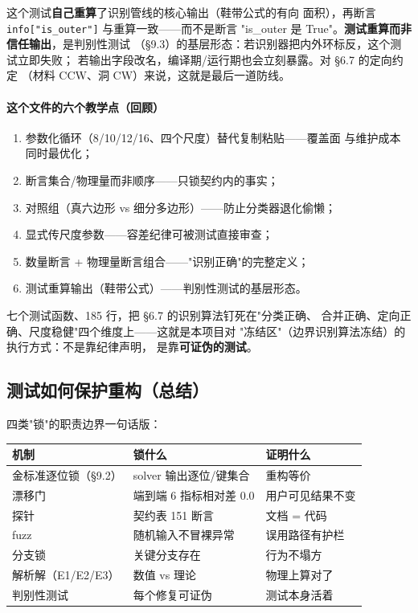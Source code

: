 \documentclass[12pt,a4paper]{ctexart}
\newcommand{\fem}{\Verb}
\begin{document}
这个测试\textbf{自己重算}了识别管线的核心输出（鞋带公式的有向
面积），再断言 \fem|info["is_outer"]| 与重算一致——而不是断言
"is\_outer 是 True"。\textbf{测试重算而非信任输出}，是判别性测试
（§9.3）的基层形态：若识别器把内外环标反，这个测试立即失败；
若输出字段改名，编译期/运行期也会立刻暴露。对 §6.7 的定向约定
（材料 CCW、洞 CW）来说，这就是最后一道防线。

\paragraph{这个文件的六个教学点（回顾）}

\begin{enumerate}[leftmargin=*]
  \item 参数化循环（8/10/12/16、四个尺度）替代复制粘贴——覆盖面
        与维护成本同时最优化；
  \item 断言集合/物理量而非顺序——只锁契约内的事实；
  \item 对照组（真六边形 vs 细分多边形）——防止分类器退化偷懒；
  \item 显式传尺度参数——容差纪律可被测试直接审查；
  \item 数量断言 + 物理量断言组合——"识别正确"的完整定义；
  \item 测试重算输出（鞋带公式）——判别性测试的基层形态。
\end{enumerate}

七个测试函数、185 行，把 §6.7 的识别算法钉死在"分类正确、
合并正确、定向正确、尺度稳健"四个维度上——这就是本项目对
"冻结区"（边界识别算法冻结）的执行方式：不是靠纪律声明，
是靠\textbf{可证伪的测试}。

\subsection{测试如何保护重构（总结）}

四类"锁"的职责边界一句话版：

\begin{table}[h]
\centering
\small
\begin{tabular}{p{4.6cm}p{4.4cm}p{5.6cm}}
\toprule
\textbf{机制} & \textbf{锁什么} & \textbf{证明什么} \\
\midrule
金标准逐位锁（§9.2） & solver 输出逐位/键集合 & 重构等价 \\
漂移门 & 端到端 6 指标相对差 0.0 & 用户可见结果不变 \\
探针 & 契约表 151 断言 & 文档 = 代码 \\
fuzz & 随机输入不冒裸异常 & 误用路径有护栏 \\
分支锁 & 关键分支存在 & 行为不塌方 \\
解析解（E1/E2/E3） & 数值 vs 理论 & 物理上算对了 \\
判别性测试 & 每个修复可证伪 & 测试本身活着 \\
\bottomrule
\end{tabular}
\end{table}
\end{document}
